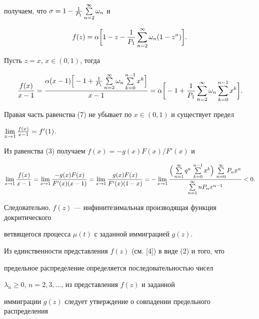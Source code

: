 получаем, что $\sigma =1-\frac 1{P_1}\sum \limits_ {n=2}^{\infty }\omega_n$ и


$$


f(z)=\alpha \bigg[1-z-\frac 1{P_1}\Su {n=2}^{\infty }


\omega_n(1-z^n)\bigg].


$$


Пусть $z=x$, $x\in (0, 1)$, тогда


\begin{equation}


\frac {f(x)}{x-1}=\frac {\alpha (x-1)\Big[-1+\frac 1{P_1}


\Su {n=2}^{\infty }\omega_n \Su {k=0}^{n-1}x^k\Big]}{x-1}=


\alpha \bigg[-1+\frac 1{P_1}\Su {n=2}^{\infty }\omega_n


\Su {k=0}^{n-1}x^k\bigg].


\end{equation}


Правая часть равенства (7) не убывает по $x\in (0,1)$ и существует предел


$\lim \limits_ {x\to 1}\frac {f(x)}{x-1}=f'(1)$.





Из равенства (3) получаем $f(x)=-g(x)F(x)/F'(x)$ и


$$


\Li {x\to 1}\frac {f(x)}{x-1}=\Li {x\to 1}\frac {-g(x)F(x)}{F'(x)(x-1)}=


\Li {x\to 1}\frac {g(x)F(x)}{F'(x)(1-x)}=


-\Li {x\to 1}\frac {\Big(\Su {n=1}^{\infty }q^n\,


\Su {k=0}^{n-1}x^k \Big)


\, \Su {n=0}^{\infty }P_nx^n}{\Su {n=1}^{\infty }nP_nx^{n-1}}<0.


$$


Следовательно, $f(z)$ --- инфинитезимальная производящая функция докритического


ветвящегося процесса $\mu (t)$ с заданной иммиграцией $g(z)$.


Из единственности представления $f(z)$ (см. [4]) в виде (2) и того, что


предельное распределение определяется последовательностью чисел


$\lambda_n\geq 0$, $n=2, 3, \dotsc$, из представления $f(z)$ и заданной


иммиграции $g(z)$ следует утверждение о совпадении предельного распределения


